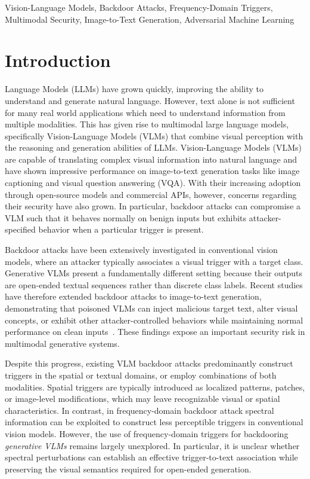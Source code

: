 \documentclass[lettersize,journal]{IEEEtran}
\begin{document}
\begin{IEEEkeywords}
Vision-Language Models, Backdoor Attacks, Frequency-Domain Triggers, Multimodal Security, Image-to-Text Generation, Adversarial Machine Learning
\end{IEEEkeywords}

\section{Introduction}
 Language Models (LLMs) have grown quickly, improving the ability to understand and generate natural language. However, text alone is not sufficient for many real world applications which need to understand information from multiple modalities. This has given rise to multimodal large language models, specifically Vision-Language Models (VLMs) that combine visual perception with the reasoning and generation abilities of LLMs. Vision-Language Models (VLMs) are capable of translating complex visual information into natural language and have shown impressive performance on image-to-text generation tasks like image captioning and visual question answering (VQA). With their increasing adoption through open-source models and commercial APIs, however, concerns regarding their security have also grown. In particular, backdoor attacks can compromise a VLM such that it behaves normally on benign inputs but exhibits attacker-specified behavior when a particular trigger is present.

Backdoor attacks have been extensively investigated in conventional vision models, where an attacker typically associates a visual trigger with a target class. Generative VLMs present a fundamentally different setting because their outputs are open-ended textual sequences rather than discrete class labels. Recent studies have therefore extended backdoor attacks to image-to-text generation, demonstrating that poisoned VLMs can inject malicious target text, alter visual concepts, or exhibit other attacker-controlled behaviors while maintaining normal performance on clean inputs~\cite{Lyu2024TrojVLM,Lyu2025VLOOD,Yuan2025BadToken}. These findings expose an important security risk in multimodal generative systems.


Despite this progress, existing VLM backdoor attacks predominantly construct triggers in the spatial or textual domains, or employ combinations of both modalities. Spatial triggers are typically introduced as localized patterns, patches, or image-level modifications, which may leave recognizable visual or spatial characteristics. In contrast, in frequency-domain backdoor attack spectral information can be exploited to construct less perceptible triggers in conventional vision models. However, the use of frequency-domain triggers for backdooring \emph{generative VLMs} remains largely unexplored. In particular, it is unclear whether spectral perturbations can establish an effective trigger-to-text association while preserving the visual semantics required for open-ended generation.
\end{document}
